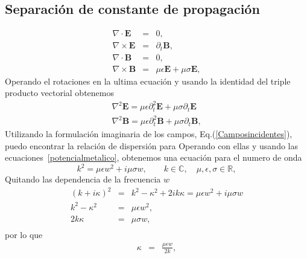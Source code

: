 \subsection{Separación de constante de propagación}
\begin{subequations} \label{mawxellmetalicas}
	\begin{eqnarray}
	\nabla \cdot \mathbf{E} &=& 0 ,\\
	\nabla \times \mathbf{E} &=& \partial_{t}\mathbf{B}, \\
	\nabla \cdot \mathbf{B} &=& 0, \\ 
	\nabla \times \mathbf{B} &=& \mu \epsilon \mathbf{E} + \mu \sigma \mathbf{E}  ,
	\end{eqnarray}
\end{subequations}
Operando el rotaciones en la ultima ecuación y usando la identidad del triple producto vectorial obtenemos
\begin{subequations}\label{potencialmetalico}
	\begin{align}
	\nabla^2 \mathbf{E}=\mu \epsilon \partial_{t}^2\mathbf{E}+\mu\sigma \partial_{t} \mathbf{E} \\
	\nabla^2 \mathbf{B}=\mu \epsilon \partial_{t}^2\mathbf{B}+\mu\sigma \partial_{t} \mathbf{B} ,
	\end{align}
\end{subequations}
Utilizando la formulación imaginaria de los campos, Eq.(\ref{Camposincidentes}), puedo encontrar la relación de dispersión para 
Operando con ellas y usando las ecuaciones~\ref{potencialmetalico}, obtenemos una ecuación para
el numero de onda
\begin{equation}
k^2=\mu \epsilon w^2 + i \mu \sigma w, \qquad k \in \mathbb{C}, \quad \mu, \epsilon, \sigma \in \mathbb{R},
\end{equation}
Quitando las dependencia de la frecuencia $w$ 
\begin{subequations}
	\begin{eqnarray}
	(k+i\kappa)^2 &=& k^2-\kappa^2+2ik\kappa=\mu\epsilon w^2+i\mu\sigma w \nonumber \\
	k^2 - \kappa^2 &=& \mu \epsilon w^2, \\ 
	2 k \kappa &=& \mu \sigma w \nonumber, \\
	\end{eqnarray}
\end{subequations}
por lo que 
\begin{eqnarray}
\kappa &=& \frac{\mu \epsilon w}{2 k},
\end{eqnarray}


